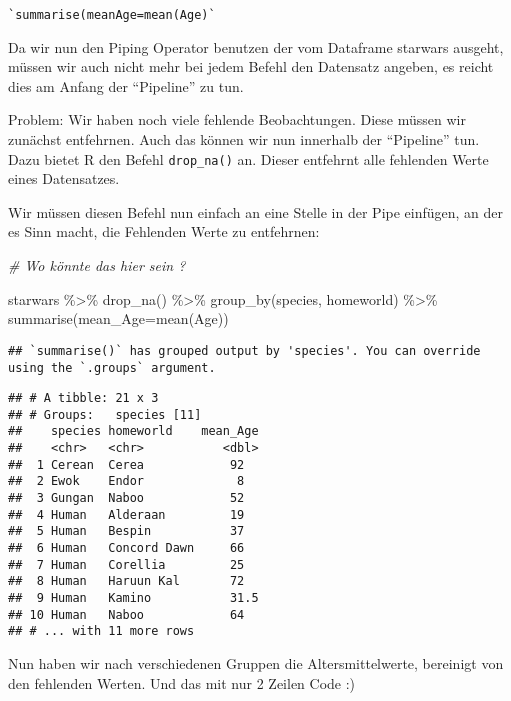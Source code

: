 \documentclass[
]{book}
\newenvironment{Shaded}{\begin{snugshade}}{\end{snugshade}}
\newcommand{\AttributeTok}[1]{\textcolor[rgb]{0.77,0.63,0.00}{#1}}
\newcommand{\CommentTok}[1]{\textcolor[rgb]{0.56,0.35,0.01}{\textit{#1}}}
\newcommand{\FunctionTok}[1]{\textcolor[rgb]{0.00,0.00,0.00}{#1}}
\newcommand{\NormalTok}[1]{#1}
\newcommand{\SpecialCharTok}[1]{\textcolor[rgb]{0.00,0.00,0.00}{#1}}
\theoremstyle{definition}
\theoremstyle{definition}
\theoremstyle{definition}
\theoremstyle{definition}
\theoremstyle{remark}
\begin{document}
\begin{verbatim}
`summarise(meanAge=mean(Age)`
\end{verbatim}

Da wir nun den Piping Operator benutzen der vom Dataframe starwars ausgeht, müssen wir auch nicht mehr bei jedem Befehl den Datensatz angeben, es reicht dies am Anfang der ``Pipeline'' zu tun.

Problem: Wir haben noch viele fehlende Beobachtungen. Diese müssen wir zunächst entfehrnen. Auch das können wir nun innerhalb der ``Pipeline'' tun. Dazu bietet R den Befehl \texttt{drop\_na()} an. Dieser entfehrnt alle fehlenden Werte eines Datensatzes.

Wir müssen diesen Befehl nun einfach an eine Stelle in der Pipe einfügen, an der es Sinn macht, die Fehlenden Werte zu entfehrnen:

\begin{Shaded}
\begin{Highlighting}[]
\CommentTok{\# Wo könnte das hier sein ? }

\NormalTok{starwars }\SpecialCharTok{\%\textgreater{}\%} \FunctionTok{drop\_na}\NormalTok{() }\SpecialCharTok{\%\textgreater{}\%}
  \FunctionTok{group\_by}\NormalTok{(species, homeworld) }\SpecialCharTok{\%\textgreater{}\%} 
  \FunctionTok{summarise}\NormalTok{(}\AttributeTok{mean\_Age=}\FunctionTok{mean}\NormalTok{(Age))}
\end{Highlighting}
\end{Shaded}

\begin{verbatim}
## `summarise()` has grouped output by 'species'. You can override using the `.groups` argument.
\end{verbatim}

\begin{verbatim}
## # A tibble: 21 x 3
## # Groups:   species [11]
##    species homeworld    mean_Age
##    <chr>   <chr>           <dbl>
##  1 Cerean  Cerea            92  
##  2 Ewok    Endor             8  
##  3 Gungan  Naboo            52  
##  4 Human   Alderaan         19  
##  5 Human   Bespin           37  
##  6 Human   Concord Dawn     66  
##  7 Human   Corellia         25  
##  8 Human   Haruun Kal       72  
##  9 Human   Kamino           31.5
## 10 Human   Naboo            64  
## # ... with 11 more rows
\end{verbatim}

Nun haben wir nach verschiedenen Gruppen die Altersmittelwerte, bereinigt von den fehlenden Werten. Und das mit nur 2 Zeilen Code :)
\end{document}
